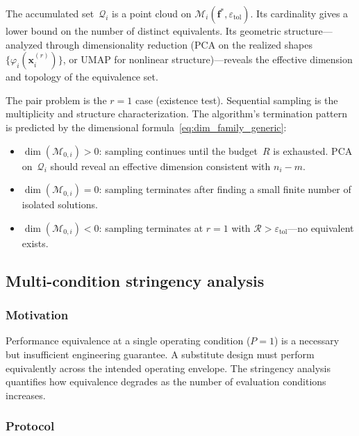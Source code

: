 The accumulated set~$\mathcal{Q}_i$ is a point cloud on $\mathcal{M}_i(\mathbf{f}^*, \varepsilon_{\mathrm{tol}})$. Its cardinality gives a lower bound on the number of distinct equivalents. Its geometric structure---analyzed through dimensionality reduction (PCA on the realized shapes $\{\varphi_i(\mathbf{x}_i^{(r)})\}$, or UMAP for nonlinear structure)---reveals the effective dimension and topology of the equivalence set.

The pair problem is the $r = 1$ case (existence test). Sequential sampling is the multiplicity and structure characterization. The algorithm's termination pattern is predicted by the dimensional formula~\eqref{eq:dim_family_generic}:
\begin{itemize}
    \item $\dim(\mathcal{M}_{0,i}) > 0$: sampling continues until the budget~$R$ is exhausted. PCA on~$\mathcal{Q}_i$ should reveal an effective dimension consistent with $n_i - m$.
    \item $\dim(\mathcal{M}_{0,i}) = 0$: sampling terminates after finding a small finite number of isolated solutions.
    \item $\dim(\mathcal{M}_{0,i}) < 0$: sampling terminates at $r = 1$ with $\mathcal{R} > \varepsilon_{\mathrm{tol}}$---no equivalent exists.
\end{itemize}


\subsection{Multi-condition stringency analysis}
\label{sec:stringency}

\subsubsection{Motivation}

Performance equivalence at a single operating condition ($P = 1$) is a necessary but insufficient engineering guarantee. A substitute design must perform equivalently across the intended operating envelope. The stringency analysis quantifies how equivalence degrades as the number of evaluation conditions increases.

\subsubsection{Protocol}

